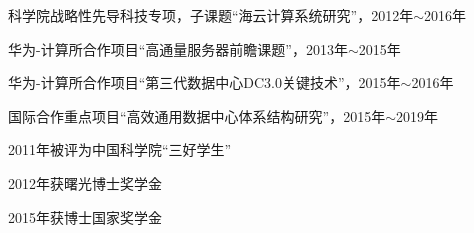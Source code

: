 \begin{resume}
  \begin{enumerate}[leftmargin=1.5\parindent, nolistsep, label={[\arabic*]}]
    \item 科学院战略性先导科技专项，子课题``海云计算系统研究''，2012年$\sim$2016年
    \item 华为-计算所合作项目``高通量服务器前瞻课题''，2013年$\sim$2015年
    \item 华为-计算所合作项目``第三代数据中心DC3.0关键技术''，2015年$\sim$2016年
    \item 国际合作重点项目``高效通用数据中心体系结构研究''，2015年$\sim$2019年
  \end{enumerate}

  \begin{enumerate}[leftmargin=1.5\parindent, nolistsep, label={[\arabic*]}]
    \item 2011年被评为中国科学院``三好学生''
    \item 2012年获曙光博士奖学金
    \item 2015年获博士国家奖学金
  \end{enumerate}
\end{resume}








